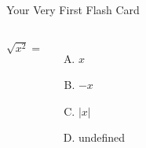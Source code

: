 \documentclass{beamer}
\begin{document}
\begin{frame}{Your Very First Flash Card} \vspace{10pt}
\begin{columns}[onlytextwidth]
$\sqrt{x^2}=$\\[10pt]
\begin{enumerate}[(A)]
\item $x$
\item $-x$
\item $|x|$
\item undefined
\end{enumerate}
\end{columns}
\end{frame}
\end{document}
